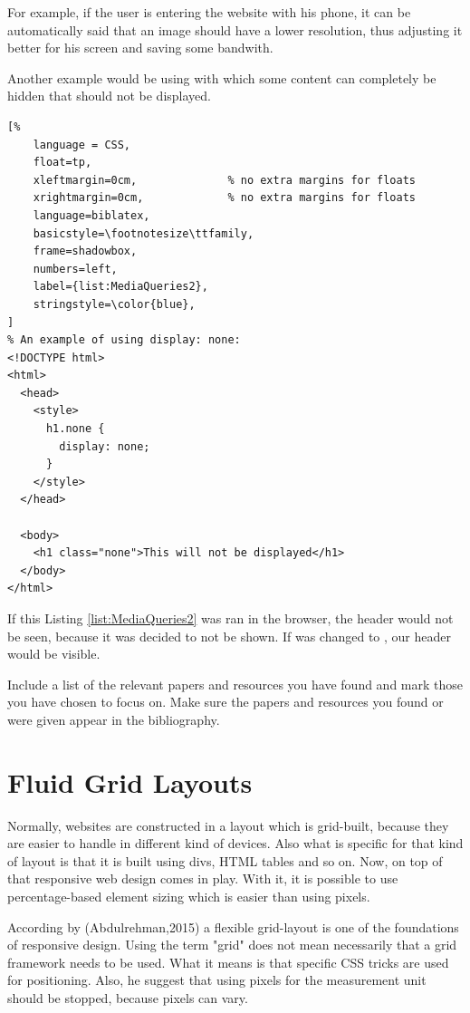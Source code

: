 For example, if the user is entering the website with his phone, it can
be automatically said that an image should have a lower resolution, thus
adjusting it better for his screen and saving some bandwith.

Another example would be using  with which some
content can completely be hidden that should not be displayed.

\begin{lstlisting}[%
    language = CSS, 
    float=tp,
    xleftmargin=0cm,              % no extra margins for floats
    xrightmargin=0cm,             % no extra margins for floats
    language=biblatex,
    basicstyle=\footnotesize\ttfamily,
    frame=shadowbox,
    numbers=left,
    label={list:MediaQueries2},
    stringstyle=\color{blue},
]
% An example of using display: none:
<!DOCTYPE html>
<html>
  <head>
    <style>
      h1.none {
        display: none;
      }
    </style>
  </head>

  <body>
    <h1 class="none">This will not be displayed</h1>
  </body>
</html>
\end{lstlisting}




%
If this Listing \ref{list:MediaQueries2} was ran in the browser, the header would not 
be seen, because it was decided to not be shown. If  was changed to 
, our header would be visible.

Include a list of  the relevant papers and resources you
have found and mark those you have chosen to focus on. Make sure
 the papers and resources you found or were given appear in
the bibliography.




\section{Fluid Grid Layouts}

Normally, websites are constructed in a layout which is grid-built,
because they are easier to handle in different kind of devices. Also
what is specific for that kind of layout is that it is built using divs,
HTML tables and so on. Now, on top of that responsive web design comes
in play\parencite{B.Frain}. With it, it is possible to use
percentage-based element sizing which is easier than using pixels.

According by (Abdulrehman,2015) a flexible grid-layout is one of the
foundations of responsive design. Using the term "grid" does not mean
necessarily that a grid framework needs to be used. What it means is
that specific CSS tricks are used for positioning. Also, he suggest that
using pixels for the measurement unit should be stopped, because pixels
can vary.

